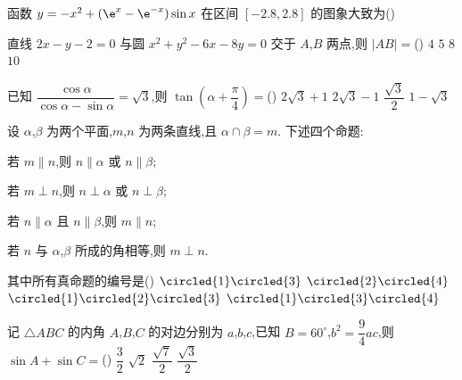 \begin{problem}
函数 \(y=-x^2+(\e^x-\e^{-x})\sin x\) 在区间 \([-2.8,2.8]\) 的图象大致为(\quad)
\choices
    {}
    {}
    {}
    {}
\end{problem}

\begin{problem}
直线 \(2x-y-2=0\) 与圆 \(x^2+y^2-6x-8y=0\) 交于 \(A\),\(B\) 两点,则 \(|AB|=\)(\quad)
\choices
    {\(4\)}
    {\(5\)}
    {\(8\)}
    {\(10\)}
\end{problem}

\begin{problem}
已知 \(\dfrac{\cos\alpha}{\cos\alpha-\sin\alpha}=\sqrt3\),则 \(\tan\left(\alpha+\dfrac\pi4\right)=\)(\quad)
\choices
    {\(2\sqrt3+1\)}
    {\(2\sqrt3-1\)}
    {\(\dfrac{\sqrt3}{2}\)}
    {\(1-\sqrt3\)}
\end{problem}

\begin{problem}
设 \(\alpha\),\(\beta\) 为两个平面,\(m\),\(n\) 为两条直线,且 \(\alpha\cap\beta=m\). 下述四个命题:
\begin{circlelist}
\item 若 \(m\parallel n\),则 \(n\parallel\alpha\) 或 \(n\parallel\beta\);
\item 若 \(m\perp n\),则 \(n\perp\alpha\) 或 \(n\perp\beta\);
\item 若 \(n\parallel\alpha\) 且 \(n\parallel\beta\),则 \(m\parallel n\);
\item 若 \(n\) 与 \(\alpha\),\(\beta\) 所成的角相等,则 \(m\perp n\).
\end{circlelist}
其中所有真命题的编号是(\quad)
\choices
    {\(\circled{1}\circled{3}\)}
    {\(\circled{2}\circled{4}\)}
    {\(\circled{1}\circled{2}\circled{3}\)}
    {\(\circled{1}\circled{3}\circled{4}\)}
\end{problem}

\begin{problem}
记 \(\triangle ABC\) 的内角 \(A\),\(B\),\(C\) 的对边分别为 \(a\),\(b\),\(c\),已知 \(B=60^\circ\),\(b^2=\dfrac94ac\),则 \(\sin A+\sin C=\)(\quad)
\choices
    {\(\dfrac32\)}
    {\(\sqrt2\)}
    {\(\dfrac{\sqrt7}{2}\)}
    {\(\dfrac{\sqrt3}{2}\)}
\end{problem}

